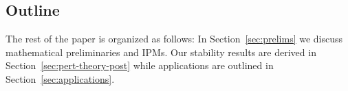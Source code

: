 \documentclass[final]{siamart171218}
\newtheorem{assumption}{Assumption}
\begin{document}









  


  

\subsection{Outline}\label{sec:outline} 
The rest of the paper is organized as follows: In Section~\ref{sec:prelims} we discuss mathematical preliminaries and IPMs. 
Our stability results are derived in Section~\ref{sec:pert-theory-post} while
applications are outlined in  Section~\ref{sec:applications}.
\end{document}
